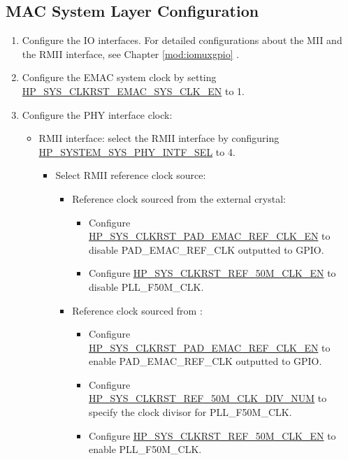 \documentclass[main\_\_EN.tex]{subfiles}
\begin{document}
\subsection{MAC System Layer Configuration}
\begin{enumerate}
\item Configure the IO interfaces. For detailed configurations about the MII and the RMII interface, see Chapter  \ref{mod:iomuxgpio} \textit{}.
\item Configure the EMAC system clock by setting \hyperref[regdesc:HPSYSCLKRSTSOCCLKCTRL1REG]{HP\_SYS\_CLKRST\_EMAC\_SYS\_CLK\_EN} to 1.
\item Configure the PHY interface clock:
\begin{itemize}
    \item RMII interface: select the RMII interface by configuring \hyperref[fielddesc:HPSYSTEMSYSPHYINTFSEL]{HP\_SYSTEM\_SYS\_PHY\_INTF\_SEL} to 4.
        \begin{itemize}
            \item Select RMII reference clock source:
                \begin{itemize}
                    \item Reference clock sourced from the external crystal:
                        \begin{itemize}
                            \item Configure \hyperref[regdesc:HPSYSCLKRSTSOCCLKCTRL1REG]{HP\_SYS\_CLKRST\_PAD\_EMAC\_REF\_CLK\_EN} to disable  PAD\_EMAC\_REF\_CLK outputted to GPIO.
                            \item Configure \hyperref[regdesc:HPSYSCLKRSTREFCLKCTRL1REG]{HP\_SYS\_CLKRST\_REF\_50M\_CLK\_EN} to disable PLL\_F50M\_CLK.
                        \end{itemize}
                    \item Reference clock sourced from \chipname{}:
                        \begin{itemize}
                            \item Configure \hyperref[regdesc:HPSYSCLKRSTSOCCLKCTRL1REG]{HP\_SYS\_CLKRST\_PAD\_EMAC\_REF\_CLK\_EN} to enable PAD\_EMAC\_REF\_CLK outputted to GPIO.
                            \item Configure \hyperref[regdesc:HPSYSCLKRSTREFCLKCTRL0REG]{HP\_SYS\_CLKRST\_REF\_50M\_CLK\_DIV\_NUM} to specify the clock divisor for PLL\_F50M\_CLK.
                            \item Configure \hyperref[regdesc:HPSYSCLKRSTREFCLKCTRL1REG]{HP\_SYS\_CLKRST\_REF\_50M\_CLK\_EN} to enable PLL\_F50M\_CLK.

\end{itemize}
\end{itemize}
\end{itemize}
\end{itemize}
\end{enumerate}
\end{document}
